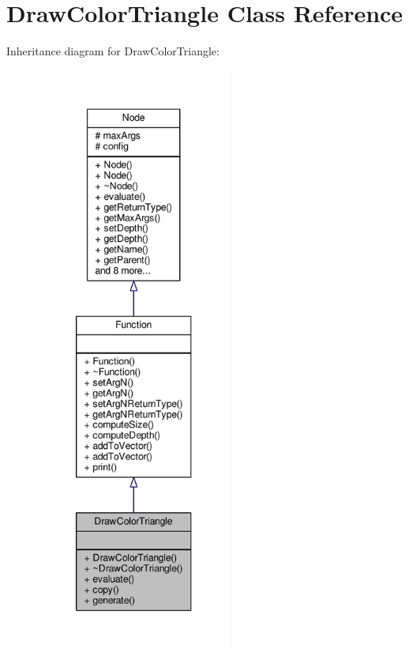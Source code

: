 \hypertarget{classDrawColorTriangle}{}\section{Draw\+Color\+Triangle Class Reference}
\label{classDrawColorTriangle}


Inheritance diagram for Draw\+Color\+Triangle\+:
\nopagebreak
\begin{figure}[H]
\begin{center}
\leavevmode
\includegraphics[height=550pt]{classDrawColorTriangle__inherit__graph}
\end{center}
\end{figure}


